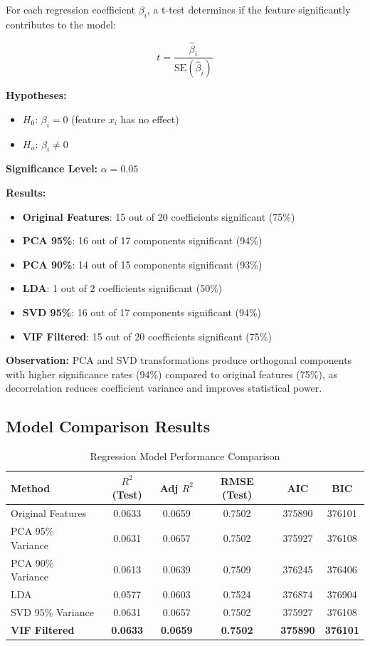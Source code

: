 \documentclass[12pt,man]{apa7}
\begin{document}
For each regression coefficient $\beta_i$, a t-test determines if the feature significantly contributes to the model:

\begin{equation}
t = \frac{\hat{\beta}_i}{\text{SE}(\hat{\beta}_i)}
\end{equation}

\textbf{Hypotheses:}
\begin{itemize}
    \item $H_0$: $\beta_i = 0$ (feature $x_i$ has no effect)
    \item $H_a$: $\beta_i \neq 0$
\end{itemize}

\textbf{Significance Level:} $\alpha = 0.05$

\textbf{Results:}
\begin{itemize}
    \item \textbf{Original Features}: 15 out of 20 coefficients significant (75\%)
    \item \textbf{PCA 95\%}: 16 out of 17 components significant (94\%)
    \item \textbf{PCA 90\%}: 14 out of 15 components significant (93\%)
    \item \textbf{LDA}: 1 out of 2 coefficients significant (50\%)
    \item \textbf{SVD 95\%}: 16 out of 17 components significant (94\%)
    \item \textbf{VIF Filtered}: 15 out of 20 coefficients significant (75\%)
\end{itemize}

\textbf{Observation:} PCA and SVD transformations produce orthogonal components with higher significance rates (94\%) compared to original features (75\%), as decorrelation reduces coefficient variance and improves statistical power.

\subsection{Model Comparison Results}

\begin{table}[H]
\centering
\caption{Regression Model Performance Comparison}
\begin{tabular}{lccccc}
\toprule
\textbf{Method} & \textbf{$R^2$ (Test)} & \textbf{Adj $R^2$} & \textbf{RMSE (Test)} & \textbf{AIC} & \textbf{BIC} \\
\midrule
Original Features & 0.0633 & 0.0659 & 0.7502 & 375890 & 376101 \\
PCA 95\% Variance & 0.0631 & 0.0657 & 0.7502 & 375927 & 376108 \\
PCA 90\% Variance & 0.0613 & 0.0639 & 0.7509 & 376245 & 376406 \\
LDA & 0.0577 & 0.0603 & 0.7524 & 376874 & 376904 \\
SVD 95\% Variance & 0.0631 & 0.0657 & 0.7502 & 375927 & 376108 \\
\textbf{VIF Filtered} & \textbf{0.0633} & \textbf{0.0659} & \textbf{0.7502} & \textbf{375890} & \textbf{376101} \\
\bottomrule
\end{tabular}
\end{table}
\end{document}
